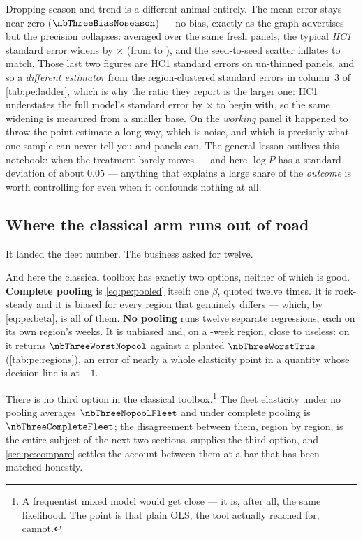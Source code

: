 Dropping season and trend is a different animal entirely. The mean error stays near zero
($\nbThreeBiasNoseason$) --- no bias, exactly as the graph advertises --- but the precision
collapses: averaged over the same \nbThreeNseed{} fresh panels, the typical \emph{HC1} standard
error widens by \nbThreeSeWiden$\times$ (from \nbThreeSeLadderFull{} to \nbThreeSeLadderNoseason),
and the seed-to-seed scatter inflates to match. Those last two figures are HC1 standard errors on
un-thinned panels, and so a \emph{different estimator} from the region-clustered standard errors in
column~3 of \cref{tab:pe:ladder}, which is why the ratio they report is the larger one: HC1
understates the full model's standard error by \nbThreeSeRatioHc$\times$ to begin with, so the same
widening is measured from a smaller base. On the \emph{working}
panel it happened to throw the point estimate a long way, which is noise, and which is precisely
what one sample can never tell you and \nbThreeNseed{} panels can. The general lesson outlives this
notebook: when the treatment barely moves --- and here $\log P$ has a standard deviation of about
$0.05$ --- anything that explains a large share of the \emph{outcome} is worth controlling for even
when it confounds nothing at all.

\subsection*{Where the classical arm runs out of road}

It landed the fleet number. The business asked for twelve.

And here the classical toolbox has exactly two options, neither of which is good.
\textbf{Complete pooling} is \cref{eq:pe:pooled} itself: one $\beta$, quoted twelve times. It is
rock-steady and it is biased for every region that genuinely differs --- which, by
\cref{eq:pe:beta}, is all of them. \textbf{No pooling} runs twelve separate regressions, each on
its own region's weeks. It is unbiased and, on a \nbThreeObsMin-week region, close to useless: on
\nbThreeWorstRegion{} it returns $\nbThreeWorstNopool$ against a planted $\nbThreeWorstTrue$
(\cref{tab:pe:regions}), an error of nearly a whole elasticity point in a quantity whose decision
line is at $-1$.

There is no third option in the classical toolbox.\footnote{A frequentist mixed model would get
close --- it is, after all, the same likelihood. The point is that plain OLS, the tool actually
reached for, cannot.} The fleet elasticity under no pooling averages $\nbThreeNopoolFleet$ and
under complete pooling is $\nbThreeCompleteFleet$; the disagreement between them, region by region,
is the entire subject of the next two sections.  supplies the third option, and
\cref{sec:pe:compare} settles the account between them at a bar that has been matched honestly.


